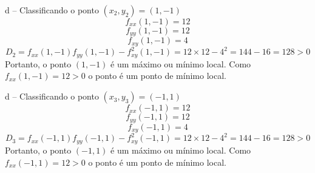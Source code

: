 \begin{resolution}{d -- Classificando o ponto \((x_2, y_2) = (1, -1)\)}
  \[
    f_{xx}(1, -1) = 12
  \]
  \[
    f_{yy}(1, -1) = 12
  \]
  \[
    f_{xy}(1, -1) = 4
  \]
  \[
    D_2
    = f_{xx}(1, -1)f_{yy}(1, -1) - f^2_{xy}(1, -1)
    = 12 \times 12 - 4^2
    = 144 -16
    = 128 > 0
  \]
  Portanto, o ponto $(1, -1)$ é um máximo ou mínimo local.
  Como \(f_{xx}(1, -1) = 12 > 0\)
  o ponto é um ponto de mínimo local.
\end{resolution}

\begin{resolution}{d -- Classificando o ponto \((x_3, y_3) = (-1, 1)\)}
  \[
    f_{xx}(-1, 1) = 12
  \]
  \[
    f_{yy}(-1, 1) = 12
  \]
  \[
    f_{xy}(-1, 1) = 4
  \]
  \[
    D_3
    = f_{xx}(-1, 1)f_{yy}(-1, 1) - f^2_{xy}(-1, 1)
    = 12 \times 12 - 4^2
    = 144 -16
    = 128 > 0
  \]
  Portanto, o ponto $(-1, 1)$ é um máximo ou mínimo local.
  Como \(f_{xx}(-1, 1) = 12 > 0\)
  o ponto é um ponto de mínimo local.
\end{resolution}


